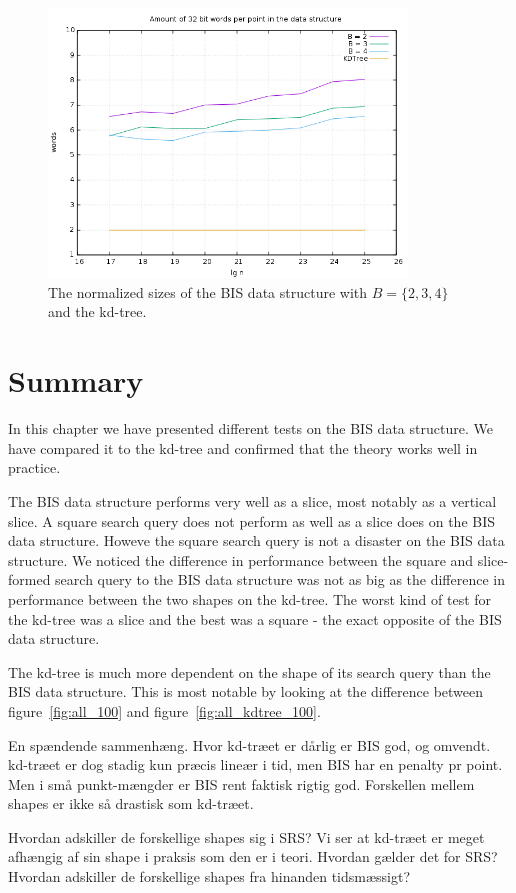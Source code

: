 \begin{figure}[h]
    \centering
    \includegraphics[width = 0.85\textwidth]{pictures/analysis/sizes.png}
    \caption{The normalized sizes of the BIS data structure with $B=\{2,3,4\}$ and the kd-tree.}\label{fig:sizes}
\end{figure}













\section{Summary}

In this chapter we have presented different tests on the BIS data structure. We have compared it to the kd-tree and confirmed that the theory works well in practice.

The BIS data structure performs very well as a slice, most notably as a vertical slice. A square search query does not perform as well as a slice does on the BIS data structure. Howeve the square search query is not a disaster on the BIS data structure. We noticed the difference in performance between the square and slice-formed search query to the BIS data structure was not as big as the difference in performance between the two shapes on the kd-tree. The worst kind of test for the kd-tree was a slice and the best was a square - the exact opposite of the BIS data structure.

The kd-tree is much more dependent on the shape of its search query than the BIS data structure. This is most notable by looking at the difference between figure~\ref{fig:all_100} and figure~\ref{fig:all_kdtree_100}.


En spændende sammenhæng. Hvor kd-træet er dårlig er BIS god, og omvendt. kd-træet er dog stadig kun præcis lineær i tid, men BIS har en penalty pr point. Men i små punkt-mængder er BIS rent faktisk rigtig god. Forskellen mellem shapes er ikke så drastisk som kd-træet.

Hvordan adskiller de forskellige shapes sig i SRS? Vi ser at kd-træet er meget afhængig af sin shape i praksis som den er i teori. Hvordan gælder det for SRS? Hvordan adskiller de forskellige shapes fra hinanden tidsmæssigt? 
